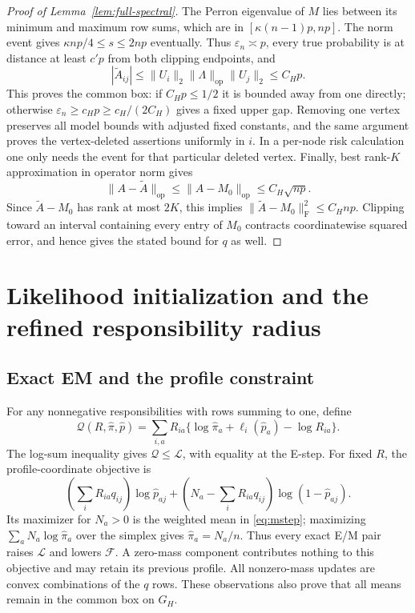 \documentclass[11pt]{article}
\theoremstyle{definition}
\theoremstyle{remark}
\numberwithin{equation}{section}
\begin{document}
\begin{proof}[Proof of Lemma~\ref{lem:full-spectral}]
The Perron eigenvalue of $M$ lies between its minimum and maximum row sums, which are in $[\kappa(n-1)p,np]$. The norm event gives $\kappa np/4\le s\le2np$ eventually. Thus $\varepsilon_n\asymp p$, every true probability is at distance at least $c'p$ from both clipping endpoints, and
\[
 |\widetilde A_{ij}|\le\|U_i\|_2\|\Lambda\|_{\mathrm{op}}\|U_j\|_2\le C_Hp.
\]
This proves the common box: if $C_Hp\le1/2$ it is bounded away from one directly; otherwise $\varepsilon_n\ge c_Hp\ge c_H/(2C_H)$ gives a fixed upper gap. Removing one vertex preserves all model bounds with adjusted fixed constants, and the same argument proves the vertex-deleted assertions uniformly in $i$. In a per-node risk calculation one only needs the event for that particular deleted vertex.
Finally, best rank-$K$ approximation in operator norm gives
\[
 \|A-\widetilde A\|_{\mathrm{op}}
 \le\|A-M_0\|_{\mathrm{op}}\le C_H\sqrt{np}.
\]
Since $\widetilde A-M_0$ has rank at most $2K$, this implies
$\|\widetilde A-M_0\|_{\mathrm F}^2\le C_Hnp$.
Clipping toward an interval containing every entry of $M_0$ contracts coordinatewise squared error, and hence gives the stated bound for $q$ as well.
\end{proof}


\section{Likelihood initialization and the refined responsibility radius}
\label{app:replacement-proof}
\subsection{Exact EM and the profile constraint}
For any nonnegative responsibilities with rows summing to one, define
\[
 \mathcal Q(R,\widehat\pi,\widehat p)
 =\sum_{i,a}R_{ia}\{\log\widehat\pi_a+\ell_i(\widehat p_a)-\log R_{ia}\}.
\]
The log-sum inequality gives $\mathcal Q\le\mathcal L$, with equality at the E-step. For fixed $R$, the profile-coordinate objective is
\[
 \left(\sum_iR_{ia}q_{ij}\right)\log\widehat p_{aj}
 +\left(N_a-\sum_iR_{ia}q_{ij}\right)\log(1-\widehat p_{aj}).
\]
Its maximizer for $N_a>0$ is the weighted mean in \eqref{eq:mstep}; maximizing $\sum_aN_a\log\widehat\pi_a$ over the simplex gives $\widehat\pi_a=N_a/n$. Thus every exact E/M pair raises $\mathcal L$ and lowers $\mathcal F$. A zero-mass component contributes nothing to this objective and may retain its previous profile. All nonzero-mass updates are convex combinations of the $q$ rows. These observations also prove that all means remain in the common box on $G_H$.
\end{document}
